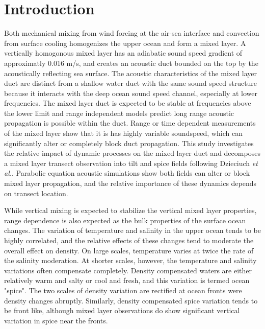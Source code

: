 \documentclass[preprint,NumberedRefs]{JASA}
\begin{document}
\section{\label{sec:intro} Introduction}
Both mechanical mixing from wind forcing at the air-sea interface and convection from surface cooling homogenizes the upper ocean and form a mixed layer\citep{cole2010seasonal}. A vertically homogonous mixed layer has an adiabatic sound speed gradient of approximatly 0.016 m/s, and creates an acoustic duct bounded on the top by the acoustically reflecting sea surface. The acoustic characteristics of the mixed layer duct are distinct from a shallow water duct with the same sound speed structure because it interacts with the deep ocean sound speed channel\citep{porter93}, especially at lower frequencies. The mixed layer duct is expected to be stable at frequencies above the lower limit\citep{Urick1982Prop} and range independent models predict long range acoustic propagation is possible within the duct. Range or time dependent measurements of the mixed layer show that it is has highly variable soundspeed\citep{cole2010seasonal,rudnick1999compensation,klymak2015}, which can significantly alter or completely block duct propagation\citep{colosi2020observations,colosi21}. This study investigates the relative impact of dynamic processes on the mixed layer duct and decomposes a mixed layer transect observation into tilt and spice fields following Dzieciuch \emph{et al.}\citep{dzieciuch2004}. Parabolic equation acoustic simulations\citep{collins93} show both fields can alter or block mixed layer propagation, and the relative importance of these dynamics depends on transect location.

While vertical mixing is expected to stabilize the vertical mixed layer properties, range dependence is also expected as the bulk properties of the surface ocean changes\citep{ferrari2000}. The variation of temperature and salinity in the upper ocean tends to be highly correlated, and the relative effects of these changes tend to moderate the overall effect on density. On large scales, temperature varies at twice the rate of the salinity moderation. At shorter scales, however, the temperature and salinity variations often compensate completely. Density compensated waters are either relatively warm and salty or cool and fresh, and this variation is termed ocean "spice"\citep{munk1981evolution}. The two scales of density variation are rectified at ocean fronts were density changes abruptly. Similarly, density compensated spice variation tends to be front like, although mixed layer observations do show significant vertical variation in spice near the fronts.
\end{document}
